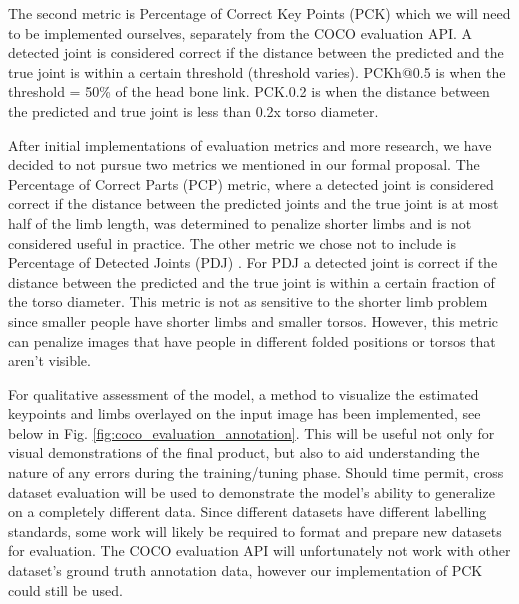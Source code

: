 \documentclass[11pt, letterpaper]{article}
\begin{document}
The second metric is Percentage of Correct Key Points (PCK) \cite{Cbsudux_2019} which we will need to be implemented ourselves, separately from the COCO evaluation API. A detected joint is considered correct if the distance between the predicted and the true joint is within a certain threshold (threshold varies). PCKh@0.5 is when the threshold = 50\% of the head bone link. PCK.0.2 is when the distance between the predicted and true joint is less than 0.2x torso diameter.

After initial implementations of evaluation metrics and more research, we have decided to not pursue two metrics we mentioned in our formal proposal. The Percentage of Correct Parts (PCP) \cite{Cbsudux_2019} metric, where a detected joint is considered correct if the distance between the predicted joints and the true joint is at most half of the limb length, was determined to penalize shorter limbs and is not considered useful in practice. The other metric we chose not to include is Percentage of Detected Joints (PDJ) \cite{Cbsudux_2019}. For PDJ a detected joint is correct if the distance between the predicted and the true joint is within a certain fraction of the torso diameter. This metric is not as sensitive to the shorter limb problem since smaller people have shorter limbs and smaller torsos. However, this metric can penalize images that have people in different folded positions or torsos that aren’t visible.

For qualitative assessment of the model, a method to visualize the estimated keypoints and limbs overlayed on the input image has been implemented, see below in Fig. \ref{fig:coco_evaluation_annotation}. This will be useful not only for visual demonstrations of the final product, but also to aid understanding the nature of any errors during the training/tuning phase. Should time permit, cross dataset evaluation will be used to demonstrate the model’s ability to generalize on a completely different data. Since different datasets have different labelling standards, some work will likely be required to format and prepare new datasets for evaluation. The COCO evaluation API will unfortunately not work with other dataset’s ground truth annotation data, however our implementation of PCK could still be used. 
\end{document}
